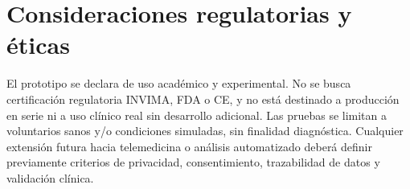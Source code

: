 \section{Consideraciones regulatorias y éticas}

El prototipo se declara de uso académico y experimental. No se busca certificación regulatoria INVIMA, FDA o CE, y no está destinado a producción en serie ni a uso clínico real sin desarrollo adicional. Las pruebas se limitan a voluntarios sanos y/o condiciones simuladas, sin finalidad diagnóstica. Cualquier extensión futura hacia telemedicina o análisis automatizado deberá definir previamente criterios de privacidad, consentimiento, trazabilidad de datos y validación clínica.

